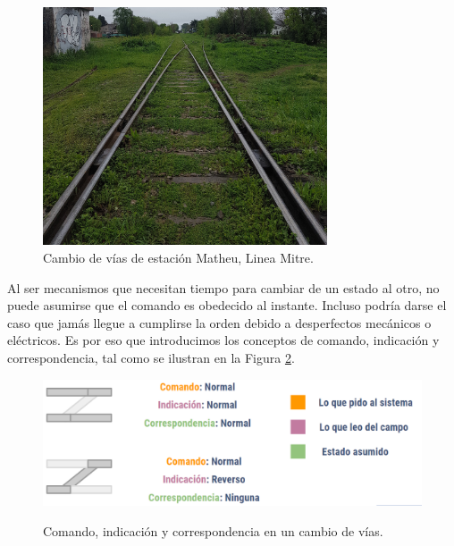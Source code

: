     \begin{figure}[H]
        \centering
        \includegraphics[width=0.75\textwidth]{Figuras/Cambios_2.jpg}
        \centering\caption{Cambio de vías de estación Matheu, Linea Mitre.}
        \label{fig:cambios_2}
    \end{figure}



    Al ser mecanismos que necesitan tiempo para cambiar de un estado al otro, no puede asumirse que el comando es obedecido al instante. Incluso podría darse el caso que jamás llegue a cumplirse la orden debido a desperfectos mecánicos o eléctricos. Es por eso que introducimos los conceptos de comando, indicación y correspondencia, tal como se ilustran en la Figura \ref{fig:cambios_4}.

    \begin{figure}[H]
        \centering
        \includegraphics[width=1\textwidth]{Figuras/cambios}
   \textit{}     \centering\caption{Comando, indicación y correspondencia en un cambio de vías.}
        \label{fig:cambios_4}
    \end{figure}
    
